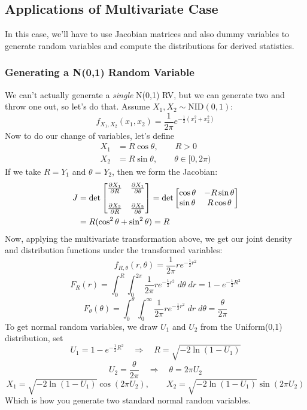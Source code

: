 \documentclass[a4paper,12pt]{scrartcl}
\begin{document}
\newpage
\subsection{Applications of Multivariate Case}

In this case, we'll have to use Jacobian matrices and also dummy
variables to generate random variables and compute the distributions
for derived statistics.


\subsubsection{Generating a N(0,1) Random Variable}

We can't actually generate a \emph{single} N(0,1) RV, but we can
generate two and throw one out, so let's do that. Assume
$X_1, X_2\sim \text{NID}(0,1)$:
   \[ f_{X_1, X_2}(x_1,x_2) = \frac{1}{2\pi} e^{-\frac{1}{2}(x_1^2 +
      x_2^2)} \]
Now to do our change of variables, let's define 
\begin{align*}
   X_1 &= R \cos\theta, \qquad R > 0 \\
   X_2 &= R \sin \theta, \qquad \theta \in [0,2\pi)
\end{align*}
If we take $R = Y_1$ and $\theta = Y_2$, then we form the Jacobian:
\begin{align}
   J &= \det \begin{bmatrix} \frac{\partial X_1}{\partial R} &
   \frac{\partial X_1}{\partial \theta} \\\\
   \frac{\partial X_2}{\partial R} &
   \frac{\partial X_2}{\partial \theta} 
   \end{bmatrix} = 
   \det \begin{bmatrix} \cos \theta & -R \sin \theta \\
      \sin \theta & R \cos \theta \end{bmatrix} \notag\\
   &= R(\cos^2 \theta + \sin^2 \theta) = R
\end{align}
Now, applying the multivariate transformation above, we get
our joint density and distribution functions under the transformed 
variables: 
   \[f_{R,\theta}(r,\theta) = \frac{1}{2\pi} r e^{-\frac{1}{2}r^2}\]
   \[ F_R(r) = \int^R_0 \int^{2\pi}_0 \frac{1}{2\pi} r e^{-\frac{1}{2}
      r^2} \; d\theta\;dr = 1 - e^{-\frac{1}{2} R^2} \]
   \[ F_\theta(\theta) = 
      \int^\theta_0 \int^\infty_0 \frac{1}{2\pi} r e^{-\frac{1}{2}
   r^2} \;dr\; d\theta = \frac{\theta}{2\pi}
      \]
To get normal random variables, we draw $U_1$ and $U_2$ from the
Uniform(0,1) distribution, set 
   \[ U_1 = 1- e^{-\frac{1}{2}R^2} \quad \Rightarrow \quad 
      R = \sqrt{-2\ln(1-U_1)} \]
   \[ U_2 = \frac{\theta}{2\pi} \quad \Rightarrow \quad 
      \theta = 2\pi U_2 \]
   \[ X_1 = \sqrt{-2\ln(1-U_1)} \cos (2\pi U_2), \qquad 
      X_2 = \sqrt{-2\ln(1-U_1)} \sin (2\pi U_2) \]
Which is how you generate two standard normal random variables.
\end{document}
